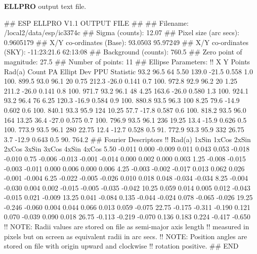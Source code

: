 \documentclass[twoside,11pt]{starlink}
\begin{document}
\newpage
\textbf{ELLPRO} output text file.
\begin{terminalv}
## ESP ELLPRO V1.1 OUTPUT FILE
##
## Filename:
/local2/data/esp/ic3374c
## Sigma (counts):
12.07
## Pixel size (arc secs):
0.9605179
## X/Y co-ordinates (Base):
93.0503 95.97249
## X/Y co-ordinates (SKY):
-11:23:21.6 62:13:08
## Background (counts):
760.5
## Zero point of magnitude:
27.5
## Number of points:
11
## Ellipse Parameters:
!! X       Y     Points   Rad(a)   Count     PA     Ellipt   Dev   PPU  Statistic
  93.2    96.5     64      5.50     139.0   -21.5   0.558     1.0  100.     899.5
  93.0    96.1     20      0.75     212.3   -26.0   0.141     0.7  100.     972.8
  92.9    96.2     20      1.25     211.2   -26.0   0.141     0.8  100.     971.7
  93.2    96.1     48      4.25     163.6   -26.0   0.580     1.3  100.     924.1
  93.2    96.4     76      6.25     120.3   -16.9   0.584     0.9  100.     880.8
  93.5    96.3    100      8.25      79.6   -14.9   0.602     0.6  100.     840.1
  93.3    95.9    124     10.25      57.7   -17.8   0.587     0.6  100.     818.2
  93.5    96.0    164     13.25      36.4   -27.0   0.575     0.7  100.     796.9
  93.5    96.1    236     19.25      13.4   -15.9   0.626     0.5  100.     773.9
  93.5    96.1    280     22.75      12.4   -12.7   0.528     0.5   91.     772.9
  93.3    95.9    332     26.75       3.7   -12.9   0.643     0.5   90.     764.2
## Fourier Descriptors
!! Rad(a)   1xSin   1xCos   2xSin   2xCos   3xSin   3xCos   4xSin   4xCos
     5.50   -0.011   0.000  -0.009   0.011   0.043   0.053  -0.018  -0.010
     0.75   -0.006  -0.013  -0.001  -0.014   0.000   0.002   0.000   0.003
     1.25   -0.008  -0.015  -0.003  -0.011   0.000   0.006   0.000   0.006
     4.25   -0.003  -0.002  -0.017   0.013   0.062   0.026  -0.001  -0.004
     6.25   -0.022  -0.005  -0.026   0.010   0.018   0.048  -0.034  -0.034
     8.25   -0.004  -0.030   0.004   0.002  -0.015  -0.005  -0.035  -0.042
    10.25    0.059   0.014   0.005   0.012  -0.043  -0.015   0.021  -0.009
    13.25    0.041  -0.084   0.135  -0.044  -0.024   0.078  -0.065  -0.026
    19.25   -0.246  -0.060   0.004   0.044   0.066   0.013   0.059  -0.075
    22.75   -0.175  -0.311  -0.190   0.121   0.070  -0.039   0.090   0.018
    26.75   -0.113  -0.219  -0.070   0.136   0.183   0.224  -0.417  -0.650
!! NOTE: Radii values are stored on file as semi-major axis length
!!       measured in pixels but on screen as equivalent radii in arc secs.
!! NOTE: Position angles are stored on file with origin upward and clockwise
!!       rotation positive.
## END
\end{terminalv}
\end{document}
